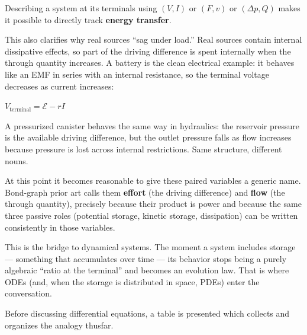 \documentclass[
  letterpaper,
  DIV=11,
  numbers=noendperiod]{scrartcl}
\begin{document}
Describing a system at its terminals using \((V,I)\) or \((F,v)\) or
\((\Delta p,Q)\) makes it possible to directly track \textbf{energy
transfer}.

This also clarifies why real sources ``sag under load.'' Real sources
contain internal dissipative effects, so part of the driving difference
is spent internally when the through quantity increases. A battery is
the clean electrical example: it behaves like an EMF in series with an
internal resistance, so the terminal voltage decreases as current
increases:

\(V_{\text{terminal}} = \mathcal{E} - rI\)

A pressurized canister behaves the same way in hydraulics: the reservoir
pressure is the available driving difference, but the outlet pressure
falls as flow increases because pressure is lost across internal
restrictions. Same structure, different nouns.

At this point it becomes reasonable to give these paired variables a
generic name. Bond-graph prior art calls them \textbf{effort} (the
driving difference) and \textbf{flow} (the through quantity), precisely
because their product is power and because the same three passive roles
(potential storage, kinetic storage, dissipation) can be written
consistently in those variables.

This is the bridge to dynamical systems. The moment a system includes
storage --- something that accumulates over time --- its behavior stops
being a purely algebraic ``ratio at the terminal'' and becomes an
evolution law. That is where ODEs (and, when the storage is distributed
in space, PDEs) enter the conversation.

Before discussing differential equations, a table is presented which
collects and organizes the analogy thusfar.
\end{document}
